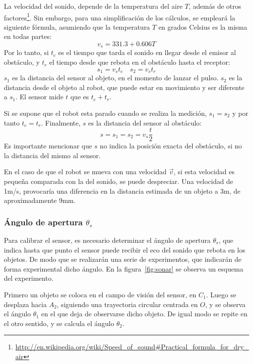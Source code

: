 \documentclass[10pt,a4paper,hidelinks,twocolumn,nobalancelastpage]{article}
\begin{document}
La velocidad del sonido, depende de la temperatura del aire $T$, además de otros
factores\footnote{\url{http://en.wikipedia.org/wiki/Speed\_of\_sound\#Practical\_formula\_for\_dry\_air}}.
Sin embargo, para una simplificación de los cálculos, se empleará la siguiente
fórmula, asumiendo que la temperatura $T$ en grados Celsius es la misma en todas 
partes:
\begin{equation}
	v_{s} = 331.3 + 0.606T \label{eq:velocidad-sonido}
\end{equation}
Por lo tanto, si $t_e$ es el tiempo que tarda el sonido en llegar desde el 
emisor al obstáculo, y $t_r$ el tiempo desde que rebota en el obstáculo hasta el 
receptor:
$$ s_1 = v_{s} t_e \quad s_2 = v_{s} t_r $$
$s_1$ es la distancia del sensor al objeto, en el momento de lanzar el pulso.  
$s_2$ es la distancia desde el objeto al robot, que puede estar en movimiento y 
ser diferente a $s_1$. El sensor mide $t$ que es $t_e+t_r$.

Si se supone que el robot esta parado cuando se realiza la medición, $s_1 = s_2$ 
y por tanto $t_e = t_r$. Finalmente, $s$ es la distancia del sensor al 
obstáculo:
\begin{equation}
	s = s_1 = s_2 = v_{s}\frac{t}{2}\label{eq:velocidad-tiempo}
\end{equation}
Es importante mencionar que $s$ no indica la posición exacta del obstáculo, si 
no la distancia del mismo al sensor.

En el caso de que el robot se mueva con una velocidad $\vec{v}$, si esta 
velocidad es pequeña comparada con la del sonido, se puede despreciar. Una 
velocidad de 1m/s, provocaría una diferencia en la distancia estimada de un 
objeto a 3m, de aproximadamente 9mm.
\subsubsection{Ángulo de apertura $\theta_{s}$}
Para calibrar el sensor, es necesario determinar el ángulo de apertura 
$\theta_{s}$, que indica hasta que punto el sensor puede recibir el eco del 
sonido que rebota en los objetos. De modo que se realizarán una serie de 
experimentos, que indicarán de forma experimental dicho ángulo. En la 
figura~\ref{fig:sonar} se observa un esquema del experimento.

Primero un objeto se coloca en el campo de visión del sensor, en $C_1$. Luego se 
desplaza hacia $A_2$, siguiendo una trayectoria circular centrada en $O$, y se 
observa el ángulo $\theta_1$ en el que deja de observarse dicho objeto. De igual 
modo se repite en el otro sentido, y se calcula el ángulo $\theta_{2}$.
\end{document}

